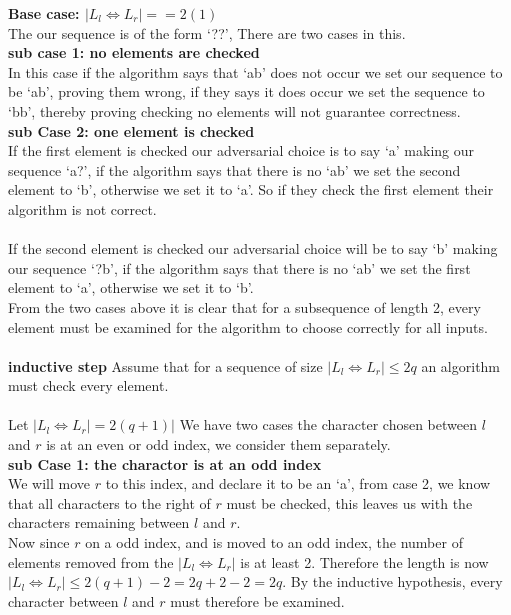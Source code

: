 \documentclass{article}
\begin{document}
      \textbf{Base case: $|L_{l} \Leftrightarrow L_{r}| == 2(1)$ }\\
      The our sequence is of the form `??', There are two cases in this.\\
      \indent \textbf{sub case 1: no elements are checked}\\
      \indent In this case if the algorithm says that `ab' does not occur we set our sequence to be `ab', proving them wrong, if they says it does occur we set the sequence to `bb', thereby proving checking no elements will not guarantee correctness.\\
      \indent \textbf{sub Case 2: one element is checked}\\
      \indent If the first element is checked our adversarial choice is to say `a' making our sequence `a?', if the algorithm says that there is no `ab' we set the second element to `b', otherwise we set it to `a'.
      \indent So if they check the first element their algorithm is not correct.\\
      \\
      \indent If the second element is checked our adversarial choice will be to say `b' making our sequence `?b', if the algorithm says that there is no `ab' we set the first element to `a', otherwise we set it to `b'.\\
      \indent From the two cases above it is clear that for a subsequence of length 2, every element must be examined for the algorithm to choose correctly for all inputs.\\
      \\
      \textbf{inductive step} Assume that for a sequence of size $|L_{l} \Leftrightarrow L_{r}| \leq 2q$ an algorithm must check every element.\\
      \\
      Let $|L_{l} \Leftrightarrow L_{r}| = 2(q + 1)|$
      We have two cases the character chosen between $l$ and $r$ is at an even or odd index, we consider them separately.\\
      \indent \textbf{sub Case 1: the charactor is at an odd index} \\
      \indent We will move $r$ to this index, and declare it to be an `a', from case 2, we know that all characters to the right of $r$ must be checked, this leaves us with the characters remaining between $l$ and $r$.\\
      \indent Now since $r$ on a odd index, and is moved to an odd index, the number of elements removed from the $|L_{l} \Leftrightarrow L_{r}|$ is at least 2. Therefore the length is now $|L_{l} \Leftrightarrow L_{r}| \leq 2(q + 1) - 2 = 2q + 2 - 2 = 2q$. By the inductive hypothesis, every character between $l$ and $r$ must therefore be examined.\\
\end{document}
